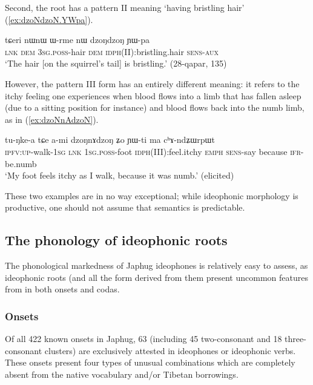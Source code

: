 Second, the root  has a pattern II  meaning `having bristling hair' (\ref{ex:dzoNdzoN.YWpa}).
 
 \begin{exe} 
\ex  \label{ex:dzoNdzoN.YWpa}
\gll  tɕeri nɯnɯ ɯ-rme nɯ dzoŋdzoŋ ɲɯ-pa\\
\textsc{lnk} \textsc{dem} \textsc{3sg}.\textsc{poss}-hair \textsc{dem} \textsc{idph}(II):bristling.hair \textsc{sens}-\textsc{aux}\\
\glt `The hair [on the squirrel's tail] is bristling.' (28-qapar, 135)
 \end{exe}
 
 However, the pattern III form   has an entirely different meaning: it refers to the itchy feeling one experiences when blood flows into a limb that has fallen asleep (due to a sitting position for instance) and blood flows back into the numb limb, as in (\ref{ex:dzoNnAdzoN}).
 
\begin{exe} 
\ex  \label{ex:dzoNnAdzoN}
\gll tu-ŋke-a tɕe a-mi dzoŋnɤdzoŋ ʑo ɲɯ-ti ma cʰɤ-ndʑɯrpɯt  \\
\textsc{ipfv}:\textsc{up}-walk-\textsc{1sg} \textsc{lnk} 1\textsc{sg}.\textsc{poss}-foot \textsc{idph}(III):feel.itchy \textsc{emph} \textsc{sens}-say because \textsc{ifr}-be.numb \\
\glt `My foot feels itchy as I walk, because it was numb.' (elicited)
\end{exe}

These two examples are in no way exceptional; while ideophonic morphology is productive, one should not assume that semantics is predictable.

 \subsection{The phonology of ideophonic roots} \label{sec:ideophonic.roots}
The phonological markedness of Japhug ideophones is relatively easy to assess, as ideophonic roots (and all the form derived from them present uncommon features from in both onsets and codas.

\subsubsection{Onsets} \label{sec:idph.onsets}
Of all 422 known onsets in Japhug, 63 (including 45 two-consonant and 18 three-consonant clusters) are exclusively attested in ideophones or ideophonic verbs. These onsets present four types of unusual combinations  which are completely absent from the native vocabulary and/or Tibetan borrowings.

